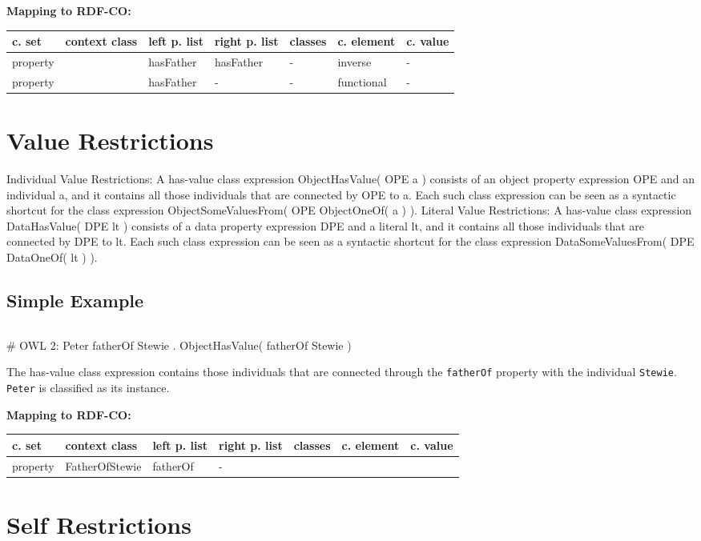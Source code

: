 \documentclass{llncs}
\newcommand{\ms}[1]{\texttt{#1}}
\newenvironment{gcotable}{
  \scriptsize
  \sffamily
  \vspace{0cm}
	\begin{center}
	\textbf{\vspace{0.4cm}Mapping to RDF-CO:} \\
  \begin{tabular}{l|l|l|l|l|l|l}
	\hline
  \textbf{c. set} & \textbf{context class} & \textbf{left p. list} & \textbf{right p. list} & \textbf{classes} & \textbf{c. element} & \textbf{c. value} \\
  \hline

}{
  \hline
  \end{tabular}
	\end{center}
}
\newenvironment{DL}{
\vspace{0cm}
	\begin{center}
  \begin{tabular}{r l}

}{
  \end{tabular}
	\end{center}
}
\begin{document}
\begin{DL}

\end{DL}

\begin{gcotable}
property &  & hasFather & hasFather & - & inverse & - \\
property &  & hasFather & - & - & functional & - \\
\end{gcotable}

\section{Value Restrictions}

Individual Value Restrictions: A has-value class expression ObjectHasValue( OPE a ) consists of an object property expression OPE and an individual a, and it contains all those individuals that are connected by OPE to a. Each such class expression can be seen as a syntactic shortcut for the class expression ObjectSomeValuesFrom( OPE ObjectOneOf( a ) ). 
Literal Value Restrictions: A has-value class expression DataHasValue( DPE lt ) consists of a data property expression DPE and a literal lt, and it contains all those individuals that are connected by DPE to lt. Each such class expression can be seen as a syntactic shortcut for the class expression DataSomeValuesFrom( DPE DataOneOf( lt ) ).

\subsection{Simple Example}

\begin{DL}

\end{DL}

\begin{ex}
# OWL 2:
Peter fatherOf Stewie . 
ObjectHasValue( fatherOf Stewie )
\end{ex}

The has-value class expression contains those individuals that are connected through the \ms{fatherOf} property with the individual \ms{Stewie}.
\ms{Peter} is classified as its instance.

\begin{gcotable}
property & FatherOfStewie & fatherOf & - &  &  \\
\end{gcotable}

\section{Self Restrictions}
\end{document}
